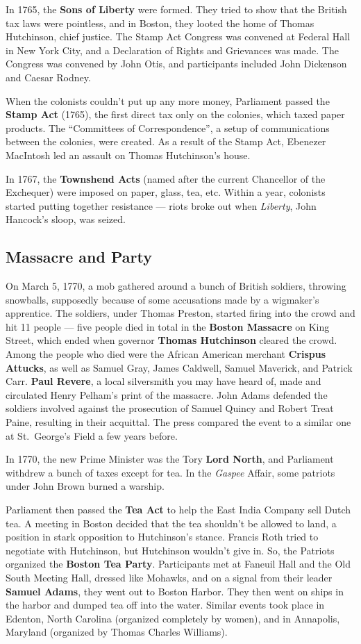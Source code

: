 In 1765, the \textbf{Sons of Liberty} were formed.
They tried to show that the British tax laws were pointless,
and in Boston, they looted the home of Thomas Hutchinson, chief justice.
The Stamp Act Congress was convened at Federal Hall in New York City,
and a Declaration of Rights and Grievances was made.
The Congress was convened by John Otis, and participants included John Dickenson and Caesar Rodney.

When the colonists couldn't put up any more money,
Parliament passed the \textbf{Stamp Act} (1765),
the first direct tax only on the colonies, which taxed paper products.
The ``Committees of Correspondence'', a setup of communications between the colonies, were created.
As a result of the Stamp Act, Ebenezer MacIntosh led an assault on Thomas Hutchinson's house.

In 1767, the \textbf{Townshend Acts} (named after the current Chancellor of the Exchequer)
were imposed on paper, glass, tea, etc.
Within a year, colonists started putting together resistance ---
riots broke out when \textit{Liberty}, John Hancock's sloop, was seized.

\subsection*{Massacre and Party}

On March 5, 1770, a mob gathered around a bunch of British soldiers, throwing snowballs,
supposedly because of some accusations made by a wigmaker's apprentice.
The soldiers, under Thomas Preston, started firing into the crowd and hit 11 people ---
five people died in total in the \textbf{Boston Massacre} on King Street,
which ended when governor \textbf{Thomas Hutchinson} cleared the crowd.
Among the people who died were the African American merchant \textbf{Crispus Attucks},
as well as Samuel Gray, James Caldwell, Samuel Maverick, and Patrick Carr.
\textbf{Paul Revere}, a local silversmith you may have heard of,
made and circulated Henry Pelham's print of the massacre.
John Adams defended the soldiers involved against the prosecution of Samuel Quincy and Robert Treat Paine,
resulting in their acquittal.
The press compared the event to a similar one at St.\ George's Field a few years before.

In 1770, the new Prime Minister was the Tory \textbf{Lord North},
and Parliament withdrew a bunch of taxes except for tea.
In the \textit{Gaspee} Affair, some patriots under John Brown burned a warship.

Parliament then passed the \textbf{Tea Act} to help the East India Company sell Dutch tea.
A meeting in Boston decided that the tea shouldn't be allowed to land,
a position in stark opposition to Hutchinson's stance.
Francis Roth tried to negotiate with Hutchinson, but Hutchinson wouldn't give in.
So, the Patriots organized the \textbf{Boston Tea Party}.
Participants met at Faneuil Hall and the Old South Meeting Hall, dressed like Mohawks,
and on a signal from their leader \textbf{Samuel Adams}, they went out to Boston Harbor.
They then went on ships in the harbor and dumped tea off into the water.
Similar events took place in Edenton, North Carolina (organized completely by women),
and in Annapolis, Maryland (organized by Thomas Charles Williams).

